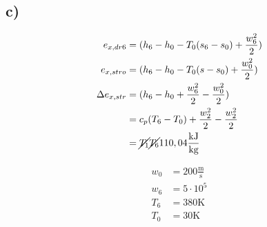 

\subsection*{c)}
\begin{align*}
    e_{x,dr6} &= (h_6 - h_0 - T_0 (s_6 - s_0) + \frac{w_6^2}{2}) \\
    e_{x,stro} &= (h_6 - h_0 - T_0 (s - s_0) + \frac{w_0^2}{2}) \\
    \Delta e_{x,str} &= (h_6 - h_0 + \frac{w_6^2}{2} - \frac{w_0^2}{2}) \\
    &= c_p (T_6 - T_0) + \frac{w_2^2}{2} - \frac{w_2^2}{2} \\
    &= \cancel{T_1} \cancel{T_6} 110,04 \frac{\text{kJ}}{\text{kg}}
\end{align*}

\begin{align*}
    w_0 &= 200 \frac{\text{m}}{\text{s}} \\
    w_6 &= 5 \cdot 10^5 \\
    T_6 &= 380 \text{K} \\
    T_0 &= 30 \text{K}
\end{align*}
